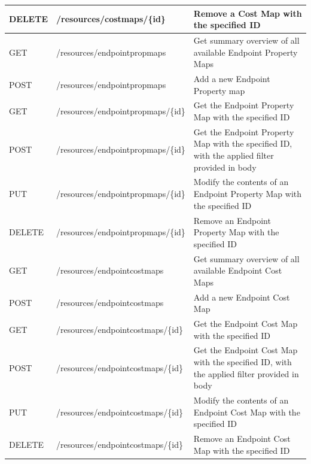 \begin{table}[]
{\begin{tabular}{|l|l|l|}
DELETE    & /resources/costmaps/\{id\}         & Remove a Cost Map with the specified ID                                                       \\ \hline
GET       & /resources/endpointpropmaps        & Get summary overview of all available Endpoint Property Maps                                  \\ \hline
POST      & /resources/endpointpropmaps        & Add a new Endpoint Property map                                                               \\ \hline
GET       & /resources/endpointpropmaps/\{id\} & Get the Endpoint Property Map with the specified ID                                           \\ \hline
POST      & /resources/endpointpropmaps/\{id\} & Get the Endpoint Property Map with the specified ID, with the applied filter provided in body \\ \hline
PUT       & /resources/endpointpropmaps/\{id\} & Modify the contents of an Endpoint Property Map with the specified ID                         \\ \hline
DELETE    & /resources/endpointpropmaps/\{id\} & Remove an Endpoint Property Map with the specified ID                                         \\ \hline
GET       & /resources/endpointcostmaps        & Get summary overview of all available Endpoint Cost Maps                                      \\ \hline
POST      & /resources/endpointcostmaps        & Add a new Endpoint Cost Map                                                                   \\ \hline
GET       & /resources/endpointcostmaps/\{id\} & Get the Endpoint Cost Map with the specified ID                                               \\ \hline
POST      & /resources/endpointcostmaps/\{id\} & Get the Endpoint Cost Map with the specified ID, with the applied filter provided in body     \\ \hline
PUT       & /resources/endpointcostmaps/\{id\} & Modify the contents of an Endpoint Cost Map with the specified ID                             \\ \hline
DELETE    & /resources/endpointcostmaps/\{id\} & Remove an Endpoint Cost Map with the specified ID                                             \\ \hline
\end{tabular}}
\end{table}

